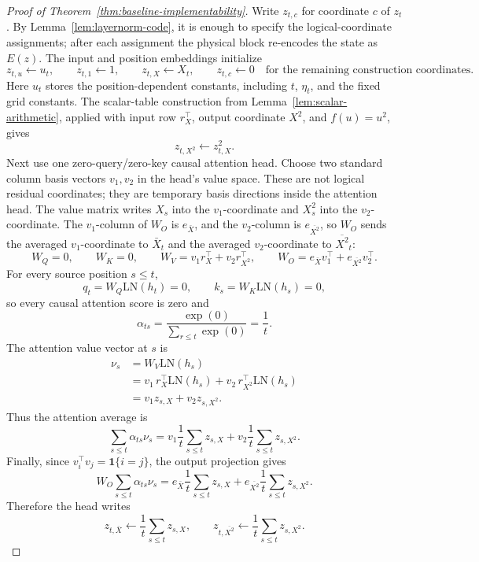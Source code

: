 \documentclass[11pt]{article}
\begin{document}
\begin{proof}[Proof of Theorem~\ref{thm:baseline-implementability}]
Write \(z_{t,c}\) for coordinate \(c\) of \(z_t\). By Lemma~\ref{lem:layernorm-code}, it is enough to specify the logical-coordinate assignments; after each assignment the physical block re-encodes the state as \(E(z)\). The input and position embeddings initialize
\[
z_{t,u}\leftarrow u_t,\qquad
z_{t,1}\leftarrow 1,\qquad
z_{t,X}\leftarrow X_t,
\qquad
z_{t,c}\leftarrow 0\quad\text{for the remaining construction coordinates.}
\]
Here \(u_t\) stores the position-dependent constants, including \(t\), \(\eta_t\), and the fixed grid constants. The scalar-table construction from Lemma~\ref{lem:scalar-arithmetic}, applied with input row \(r_X^\top\), output coordinate \(X^2\), and \(f(u)=u^2\), gives
\[
z_{t,X^2}\leftarrow z_{t,X}^2 .
\]
Next use one zero-query/zero-key causal attention head. Choose two standard column basis vectors \(v_1,v_2\) in the head's value space. These are not logical residual coordinates; they are temporary basis directions inside the attention head. The value matrix writes \(X_s\) into the \(v_1\)-coordinate and \(X_s^2\) into the \(v_2\)-coordinate. The \(v_1\)-column of \(W_O\) is \(e_{\bar X}\), and the \(v_2\)-column is \(e_{\overline{X^2}}\), so \(W_O\) sends the averaged \(v_1\)-coordinate to \(\bar X_t\) and the averaged \(v_2\)-coordinate to \(\overline{X^2}_t\):
\[
W_Q=0,\qquad W_K=0,\qquad
W_V=v_1r_X^\top+v_2r_{X^2}^\top,\qquad
W_O=e_{\bar X}v_1^\top+e_{\overline{X^2}}v_2^\top .
\]
For every source position \(s\le t\),
\[
q_t=W_Q\mathrm{LN}(h_t)=0,\qquad
k_s=W_K\mathrm{LN}(h_s)=0,
\]
so every causal attention score is zero and
\[
\alpha_{ts}
=\frac{\exp(0)}{\sum_{r\le t}\exp(0)}
=\frac1t .
\]
The attention value vector at \(s\) is
\[
\begin{aligned}
\nu_s
&=W_V\mathrm{LN}(h_s)\\
&=v_1\,r_X^\top\mathrm{LN}(h_s)
  +v_2\,r_{X^2}^\top\mathrm{LN}(h_s)\\
&=v_1 z_{s,X}+v_2 z_{s,X^2}.
\end{aligned}
\]
Thus the attention average is
\[
\sum_{s\le t}\alpha_{ts}\nu_s
=
v_1\frac1t\sum_{s\le t}z_{s,X}
+
v_2\frac1t\sum_{s\le t}z_{s,X^2}.
\]
Finally, since \(v_i^\top v_j=\mathbf 1\{i=j\}\), the output projection gives
\[
W_O\sum_{s\le t}\alpha_{ts}\nu_s
=
e_{\bar X}\frac1t\sum_{s\le t}z_{s,X}
+
e_{\overline{X^2}}\frac1t\sum_{s\le t}z_{s,X^2}.
\]
Therefore the head writes
\[
z_{t,\bar X}\leftarrow \frac1t\sum_{s\le t}z_{s,X},
\qquad
z_{t,\overline{X^2}}\leftarrow \frac1t\sum_{s\le t}z_{s,X^2}.
\]
\end{proof}
\end{document}
